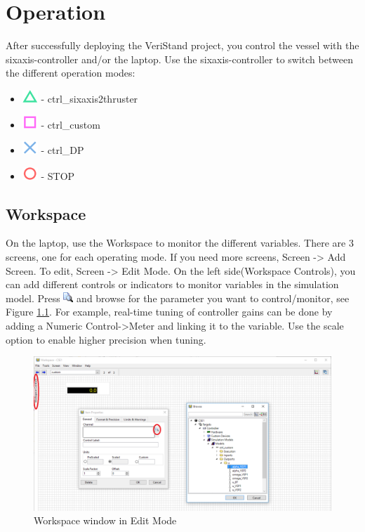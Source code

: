 \chapter{Operation}
After successfully deploying the VeriStand project, you control the vessel with the sixaxis-controller and/or the laptop. Use the sixaxis-controller to switch between the different operation modes:
\begin{itemize}
	\item \includegraphics[scale=0.5]{fig/sixaxis_triangle.png} - ctrl\_sixaxis2thruster
	\item \includegraphics[scale=0.5]{fig/sixaxis_square.png} - ctrl\_custom
	\item \includegraphics[scale=0.5]{fig/sixaxis_cross.png} - ctrl\_DP
	\item \includegraphics[scale=0.5]{fig/sixaxis_circle.png} - STOP
\end{itemize}
\section{Workspace}
On the laptop, use the Workspace to monitor the different variables. There are 3 screens, one for each operating mode. If you need more screens, Screen -> Add Screen. To edit, Screen -> Edit Mode. On the left side(Workspace Controls), you can add different controls or indicators to monitor variables in the simulation model. Press \includegraphics{fig/magnifying_glass.png} and browse for the parameter you want to control/monitor, see Figure \ref{fig:workspace}. For example, real-time tuning of controller gains can be done by adding a Numeric Control->Meter and linking it to the variable. Use the scale option to enable higher precision when tuning. 
\begin{figure}[htb!]
	\centering
	\includegraphics[scale=0.4]{fig/workspace_edit.png}
	\caption{Workspace window in Edit Mode}
	\label{fig:workspace}
\end{figure}
